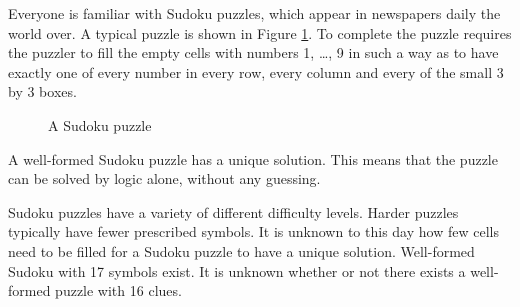 Everyone is familiar with Sudoku puzzles, which appear in newspapers daily the world over. A typical puzzle is shown in Figure \ref{sudokuexampleone}. To complete the puzzle requires the puzzler to fill the empty cells with numbers 1, \ldots , 9 in such a way as to have exactly one of every number in every row, every column and every of the small 3 by 3 boxes.

\begin{figure}[h]
\label{sudokuexampleone}
\centering
  \sudokuexampleone
\caption{A Sudoku puzzle}
\end{figure}

A well-formed Sudoku puzzle has a unique solution. This means that the puzzle can be solved by logic alone, without any guessing.

Sudoku puzzles have a variety of different difficulty levels. Harder puzzles typically have fewer prescribed symbols. It is unknown to this day how few cells need to be filled for a Sudoku puzzle to have a unique solution. Well-formed Sudoku with 17 symbols exist. It is unknown whether or not there exists a well-formed puzzle with 16 clues.


